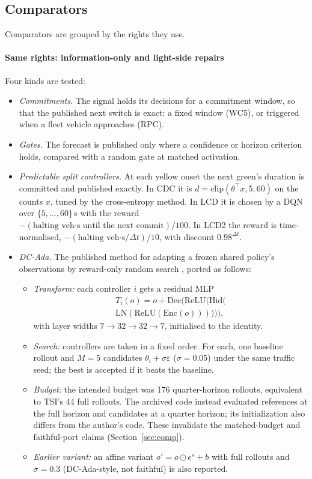 \subsection{Comparators}\label{sec:comparators}
Comparators are grouped by the rights they use.
\paragraph{Same rights: information-only and light-side repairs} Four kinds are tested:
\begin{itemize}\setlength\itemsep{1pt}
\item \emph{Commitments.} The signal holds its decisions for a commitment window, so that the published next switch is exact: a fixed
window (WC5), or triggered when a fleet vehicle approaches (RPC).
\item \emph{Gates.} The forecast is published only where a confidence or horizon criterion holds, compared with a random gate at matched
activation.
\item \emph{Predictable split controllers.} At each yellow onset the next green's duration is committed and published exactly. In CDC it
is $d=\mathrm{clip}(\theta^\top x,5,60)$ on the counts $x$, tuned by the cross-entropy method. In LCD it is chosen by a DQN over
$\{5,\dots,60\}$\,s with the reward $-(\text{halting veh·s until the next commit})/100$. In LCD2 the reward is time-normalised,
$-(\text{halting veh·s}/\Delta t)/10$, with discount $0.98^{\Delta t}$.
\item \emph{DC-Ada.} The published method for adapting a frozen shared policy's observations by reward-only random search
\cite{alqithami2026}, ported as follows:
\begin{itemize}\setlength\itemsep{0pt}
\item \emph{Transform:} each controller $i$ gets a residual MLP
\begin{multline*}T_i(o)=o+\mathrm{Dec}\big(\mathrm{ReLU}(\mathrm{Hid}(\\\mathrm{LN}(\mathrm{ReLU}(\mathrm{Enc}(o)))))\big),\end{multline*}
with layer widths $7\to32\to32\to7$, initialised to the identity.
\item \emph{Search:} controllers are taken in a fixed order. For each, one baseline rollout and $M=5$ candidates
$\theta_i+\sigma\varepsilon$ ($\sigma=0.05$) under the same traffic seed; the best is accepted if it beats the baseline.
\item \emph{Budget:} the intended budget was 176 quarter-horizon rollouts, equivalent to TSI's 44 full rollouts. The archived code instead evaluated references at the full horizon and candidates at a quarter horizon; its initialization also differs from the author's code. These invalidate the matched-budget and faithful-port claims (Section~\ref{sec:comp}).
\item \emph{Earlier variant:} an affine variant $o'=o\odot e^{s}+b$ with full rollouts and $\sigma=0.3$ (DC-Ada-style, not faithful) is
also reported.
\end{itemize}
\end{itemize}

